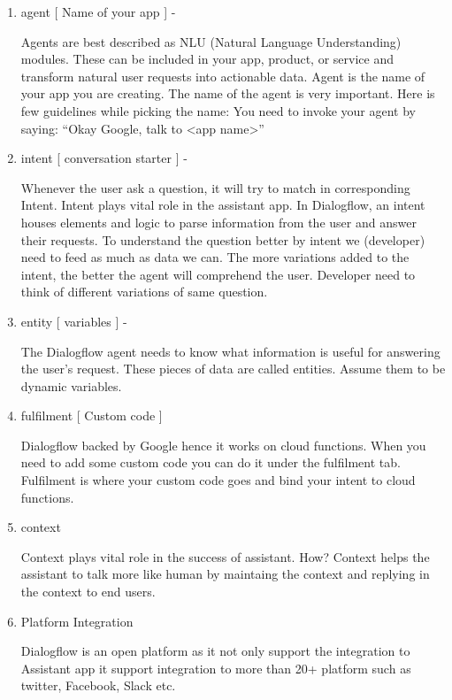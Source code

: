 \documentclass[14pt,a4paper]{article}
\begin{document}
\begin{enumerate}
\item agent [ Name of your app ] - 
\par Agents are best described as NLU (Natural Language Understanding) modules. These can be included in your app, product, or service and transform natural user requests into actionable data.
Agent is the name of your app you are creating. The name of the agent is very important. Here is few guidelines while picking the name:
You need to invoke your agent by saying:
“Okay Google, talk to <app name>”

\item intent [ conversation starter ] - 
\par Whenever the user ask a question, it will try to match in corresponding Intent. Intent plays vital role in the assistant app. In Dialogflow, an intent houses elements and logic to parse information from the user and answer their requests.
To understand the question better by intent we (developer) need to feed as much as data we can. The more variations added to the intent, the better the agent will comprehend the user. Developer need to think of different variations of same question.

\item entity [ variables ] - 
\par The Dialogflow agent needs to know what information is useful for answering the user’s request. These pieces of data are called entities. Assume them to be dynamic variables.

\item fulfilment [ Custom code ]
\par Dialogflow backed by Google hence it works on cloud functions. When you need to add some custom code you can do it under the fulfilment tab. Fulfilment is where your custom code goes and bind your intent to cloud functions.

\item context
\par Context plays vital role in the success of assistant. How? Context helps the assistant to talk more like human by maintaing the context and replying in the context to end users.

\item Platform Integration
\par Dialogflow is an open platform as it not only support the integration to Assistant app it support integration to more than 20+ platform such as twitter, Facebook, Slack etc.
\end{enumerate}
\end{document}
